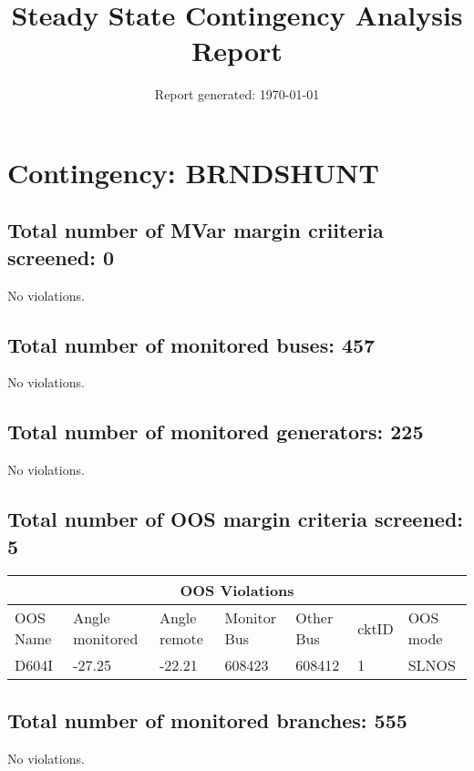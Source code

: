 \documentclass{article}%
\title{Steady State Contingency Analysis Report\vspace{-3ex}}%
\date{Report generated: \today\vspace{-2ex}}%
\begin{document}
%
\normalsize%
\maketitle%
\section*{Contingency: BRNDSHUNT}%
\label{sec:ContingencyBRNDSHUNT}%
\subsection*{Total number of MVar margin criiteria screened: 0}%
\label{subsec:TotalnumberofMVarmargincriiteriascreened0}%
No violations.

%
\subsection*{Total number of monitored buses: 457}%
\label{subsec:Totalnumberofmonitoredbuses457}%
No violations.

%
\subsection*{Total number of monitored generators: 225}%
\label{subsec:Totalnumberofmonitoredgenerators225}%
No violations.

%
\subsection*{Total number of OOS margin criteria screened: 5}%
\label{subsec:TotalnumberofOOSmargincriteriascreened5}%
\begin{tabularx}{\textwidth}{|  X |p{1.5cm} | X | X | X | X | X |}%
\hline%
\multicolumn{7}{|c|}{OOS Violations}\\%
\hline%
OOS Name&Angle monitored&Angle remote&Monitor Bus&Other Bus&cktID&OOS mode\\%
\hline%
D604I&{-}27.25&{-}22.21&608423&608412&1&SLNOS\\%
\hline%
\end{tabularx}

%
\subsection*{Total number of monitored branches: 555}%
\label{subsec:Totalnumberofmonitoredbranches555}%
No violations.

%
\end{document}
